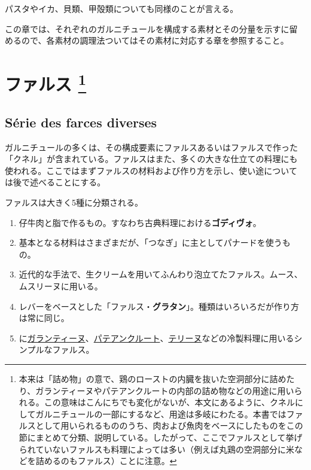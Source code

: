 パスタやイカ、貝類、甲殻類についても同様のことが言える。

この章では、それぞれのガルニチュールを構成する素材とその分量を示すに留
めるので、各素材の調理法ついてはその素材に対応する章を参照すること。

\hypertarget{ux30d5ux30a1ux30ebux30b9-5}{%
\section[ファルス ]{\texorpdfstring{ファルス \footnote{本来は「詰め物」の意で、鶏のローストの内臓を抜いた空洞部分に詰めたり、ガランティーヌやパテアンクルートの内部の詰め物などの用途に用いられる。この意味はこんにちでも変化がないが、本文にあるように、クネルにしてガルニチュールの一部にするなど、用途は多岐にわたる。本書ではファルスとして用いられるもののうち、肉および魚肉をベースにしたものをこの節にまとめて分類、説明している。したがって、ここでファルスとして挙げられていないファルスも料理によっては多い（例えば丸鶏の空洞部分に米などを詰めるのもファルス）ことに注意。}}{ファルス }}\label{ux30d5ux30a1ux30ebux30b9-5}}

\hypertarget{serie-des-farces-diverses}{%
\subsection{Série des farces diverses}\label{serie-des-farces-diverses}}

 

ガルニチュールの多くは、その構成要素にファルスあるいはファルスで作った
「クネル」が含まれている。ファルスはまた、多くの大きな仕立ての料理にも
使われる。ここではまずファルスの材料および作り方を示し、使い途について
は後で述べることにする。

ファルスは大きく5種に分類される。

\begin{enumerate}
\def\labelenumi{\arabic{enumi}.}
\item
  仔牛肉と脂で作るもの。すなわち古典料理における\textbf{ゴディヴォ}。
\item
  基本となる材料はさまざまだが、「つなぎ」に主としてパナードを使うもの。
\item
  近代的な手法で、生クリームを用いてふんわり泡立てたファルス。ムース、ムスリーヌに用いる。
\item
  レバーをベースとした「ファルス・\textbf{グラタン}」。種類はいろいろだが作り方は常に同じ。
\item
  に\protect\hyperlink{}{ガランティーヌ}、\protect\hyperlink{}{パテアンクルート}、\protect\hyperlink{}{テリーヌ}などの冷製料理に用いるシンプルなファルス。
\end{enumerate}

